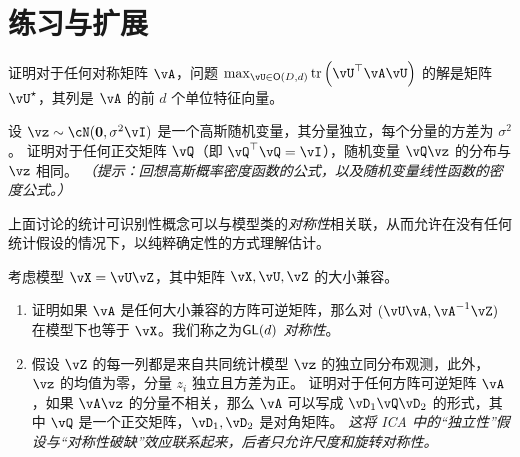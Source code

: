 \documentclass[../../book-main_zh.tex]{subfiles}
\begin{document}
\section{练习与扩展}


\begin{exercise}\label{exercise:principal-components-derivation}
    证明对于任何对称矩阵 \(\vA\)，问题 \(\max_{\vU \in \O(D, d)}\tr\left(\vU^{\top}\vA\vU\right)\) 的解是矩阵 \(\vU^{\star}\)，其列是 \(\vA\) 的前 \(d\) 个单位特征向量。
\end{exercise}

\begin{exercise}\label{exercise:gaussian-rot-invar}
    设 $\vz \sim \cN(\Zero, \sigma^2 \vI)$ 是一个高斯随机变量，其分量独立，每个分量的方差为 $\sigma^2$。
    证明对于任何正交矩阵 $\vQ$（即 $\vQ^\top \vQ = \vI$），随机变量 $\vQ \vz$ 的分布与 $\vz$ 相同。
    \textit{（提示：回想高斯概率密度函数的公式，以及随机变量线性函数的密度公式。）}
\end{exercise}

\begin{exercise}\label{exercise:symmetry-identifiability}
    上面讨论的统计可识别性概念可以与模型类的\textit{对称性}相关联，从而允许在没有任何统计假设的情况下，以纯粹确定性的方式理解估计。

    考虑模型 $\vX = \vU \vZ$，其中矩阵 $\vX, \vU, \vZ$ 的大小兼容。
    \begin{enumerate}
        \item 证明如果 $\vA$ 是任何大小兼容的方阵可逆矩阵，那么对 $(\vU \vA, \vA^{-1} \vZ)$ 在模型下也等于 $\vX$。我们称之为\textit{$\mathsf{GL}(d)$ 对称性}。
        \item 假设 $\vZ$ 的每一列都是来自共同统计模型 $\vz$ 的独立同分布观测，此外，$\vz$ 的均值为零，分量 $z_i$ 独立且方差为正。
        证明对于任何方阵可逆矩阵 $\vA$，如果 $\vA \vz$ 的分量不相关，那么 $\vA$ 可以写成 $\vD_1 \vQ \vD_2$ 的形式，其中 $\vQ$ 是一个正交矩阵，$\vD_1, \vD_2$ 是对角矩阵。
        \textit{这将 ICA 中的“独立性”假设与“对称性破缺”效应联系起来，后者只允许尺度和旋转对称性。}
    \end{enumerate}

\end{exercise}
\end{document}
